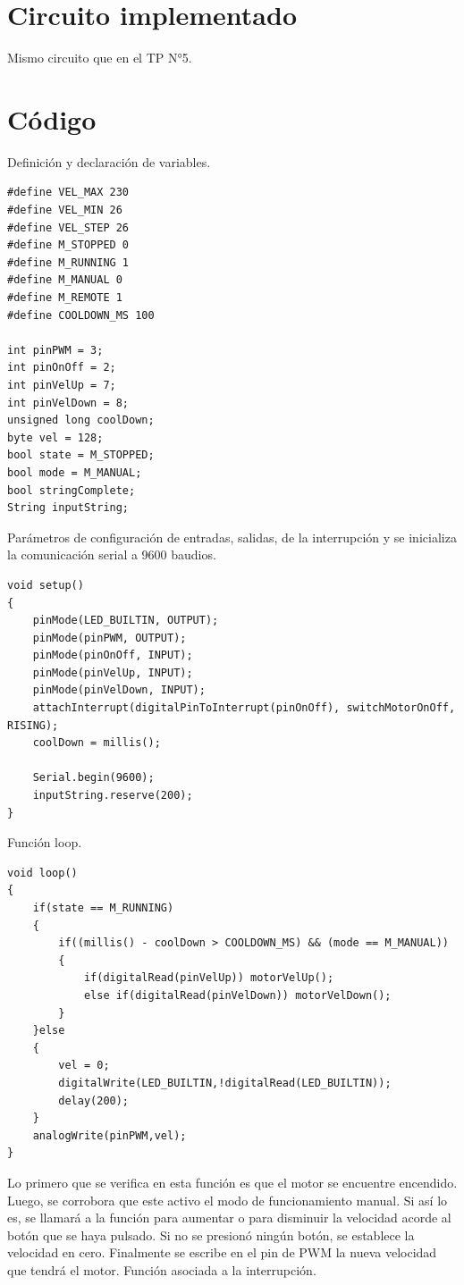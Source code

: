 \documentclass[a4paper, 12pt]{article}
\begin{document}
\newpage
{}

\section{Circuito implementado}

Mismo circuito que en el TP N°5.

\section{Código}

Definición y declaración de variables.

\begin{lstlisting}
#define VEL_MAX 230
#define VEL_MIN 26
#define VEL_STEP 26
#define M_STOPPED 0
#define M_RUNNING 1
#define M_MANUAL 0
#define M_REMOTE 1
#define COOLDOWN_MS 100

int pinPWM = 3;
int pinOnOff = 2;
int pinVelUp = 7;
int pinVelDown = 8;
unsigned long coolDown;
byte vel = 128;
bool state = M_STOPPED;
bool mode = M_MANUAL;
bool stringComplete;
String inputString;
\end{lstlisting}

Parámetros de configuración de entradas, salidas, de la interrupción y se inicializa la comunicación serial a 9600 baudios.

\begin{lstlisting}
void setup()
{
    pinMode(LED_BUILTIN, OUTPUT);
    pinMode(pinPWM, OUTPUT);
    pinMode(pinOnOff, INPUT);
    pinMode(pinVelUp, INPUT);
    pinMode(pinVelDown, INPUT);
    attachInterrupt(digitalPinToInterrupt(pinOnOff), switchMotorOnOff, RISING);
    coolDown = millis();

    Serial.begin(9600);
    inputString.reserve(200);
}
\end{lstlisting}

\newpage
Función loop.

\begin{lstlisting}
void loop()
{
    if(state == M_RUNNING)
    {
        if((millis() - coolDown > COOLDOWN_MS) && (mode == M_MANUAL))
        {
            if(digitalRead(pinVelUp)) motorVelUp();
            else if(digitalRead(pinVelDown)) motorVelDown();
        }
    }else
    {
        vel = 0;
        digitalWrite(LED_BUILTIN,!digitalRead(LED_BUILTIN));
        delay(200);
    }
    analogWrite(pinPWM,vel);
}
\end{lstlisting}

Lo primero que se verifica en esta función es que el motor se encuentre encendido. Luego, se corrobora que este activo el modo de funcionamiento manual. Si así lo es, se llamará a la función para aumentar o para disminuir la velocidad acorde al botón que se haya pulsado. Si no se presionó ningún botón, se establece la velocidad en cero. Finalmente se escribe en el pin de PWM la nueva velocidad que tendrá el motor.
Función asociada a la interrupción.
\end{document}
